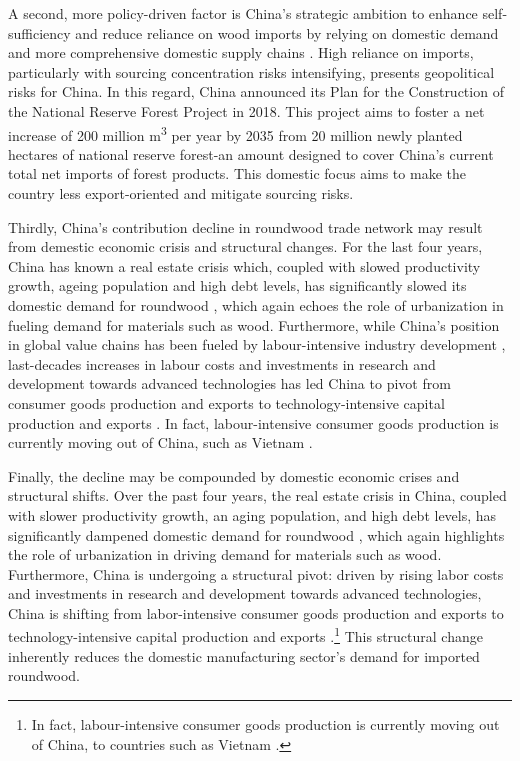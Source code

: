 \documentclass[
  authoryear,
  review,
  3p]{elsarticle}
\begin{document}
A second, more policy-driven factor is China's strategic ambition to
enhance self-sufficiency and reduce reliance on wood imports by relying
on domestic demand and more comprehensive domestic supply chains
\citep{fao_society_2021, unecefao_forest_2022-1, attinasi_navigating_2024}.
High reliance on imports, particularly with sourcing concentration risks
intensifying, presents geopolitical risks for China. In this regard,
China announced its Plan for the Construction of the National Reserve
Forest Project in 2018. This project aims to foster a net increase of
200 million m\textsuperscript{3} per year by 2035 from 20 million newly
planted hectares of national reserve forest-an amount designed to cover
China's current total net imports of forest products. This domestic
focus aims to make the country less export-oriented and mitigate
sourcing risks.

Thirdly, China's contribution decline in roundwood trade network may
result from demestic economic crisis and structural changes. For the
last four years, China has known a real estate crisis which, coupled
with slowed productivity growth, ageing population and high debt levels,
has significantly slowed its domestic demand for roundwood
\citep{world_bank_global_2025}, which again echoes the role of
urbanization in fueling demand for materials such as wood. Furthermore,
while China's position in global value chains has been fueled by
labour-intensive industry development \citep{su_assessment_2020},
last-decades increases in labour costs and investments in research and
development towards advanced technologies has led China to pivot from
consumer goods production and exports to technology-intensive capital
production and exports
\citep{fao_society_2021, attinasi_navigating_2024}. In fact,
labour-intensive consumer goods production is currently moving out of
China, such as Vietnam
\citep{fao_society_2021, attinasi_navigating_2024}.

Finally, the decline may be compounded by domestic economic crises and
structural shifts. Over the past four years, the real estate crisis in
China, coupled with slower productivity growth, an aging population, and
high debt levels, has significantly dampened domestic demand for
roundwood \citep{world_bank_global_2025}, which again highlights the
role of urbanization in driving demand for materials such as wood.
Furthermore, China is undergoing a structural pivot: driven by rising
labor costs and investments in research and development towards advanced
technologies, China is shifting from labor-intensive consumer goods
production and exports \citep{su_assessment_2020} to
technology-intensive capital production and exports
\citep{fao_society_2021, attinasi_navigating_2024}.\footnote{In fact,
  labour-intensive consumer goods production is currently moving out of
  China, to countries such as Vietnam
  \citep{fao_society_2021, attinasi_navigating_2024}.} This structural
change inherently reduces the domestic manufacturing sector's demand for
imported roundwood.
\end{document}
